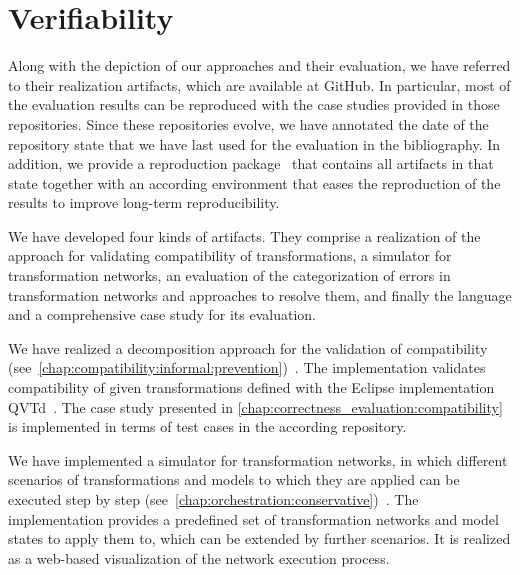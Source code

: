 \chapter{Verifiability}
\label{chap:appendix:verifiability}

Along with the depiction of our approaches and their evaluation, we have referred to their realization artifacts, which are available at GitHub.
In particular, most of the evaluation results can be reproduced with the case studies provided in those repositories.
Since these repositories evolve, we have annotated the date of the repository state that we have last used for the evaluation in the bibliography.
In addition, we provide a reproduction package~\cite{klare2021diss-reproduction} that contains all artifacts in that state together with an according environment that eases the reproduction of the results to improve long-term reproducibility.

We have developed four kinds of artifacts.
They comprise a realization of the approach for validating compatibility of transformations, a simulator for transformation networks, an evaluation of the categorization of errors in transformation networks and approaches to resolve them, and finally the \commonalities language and a comprehensive case study for its evaluation.

We have realized a decomposition approach for the validation of compatibility (see~\autoref{chap:compatibility:informal:prevention})~\cite{decompositionGithub}.
The implementation validates compatibility of given \qvtr transformations defined with the Eclipse implementation \gls{QVTd}~\cite{EclipseQVTd}.
The case study presented in \autoref{chap:correctness_evaluation:compatibility} is implemented in terms of test cases in the according repository.

We have implemented a simulator for transformation networks, in which different scenarios of transformations and models to which they are applied can be executed step by step (see~\autoref{chap:orchestration:conservative})~\cite{gleitze2020OrchestrationSimulator}.
The implementation provides a predefined set of transformation networks and model states to apply them to, which can be extended by further scenarios.
It is realized as a web-based visualization of the network execution process.

